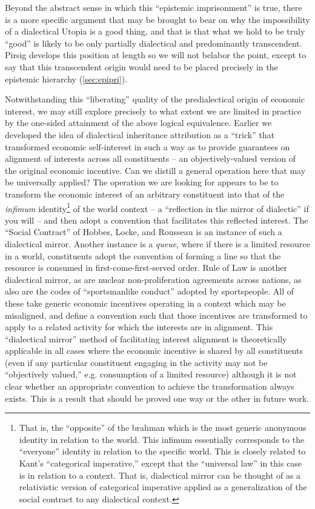 \documentclass[pra,twocolumn,groupedaddress,10pt]{revtex4}
\theoremstyle{definition}
\begin{document}
Beyond the abstract sense in which this ``epistemic imprisonment'' is true, there is a more specific argument that may be brought to bear on why the impossibility of a dialectical Utopia is a good thing, and that is that what we hold to be truly ``good'' is likely to be only partially dialectical and predominantly transcendent. Pirsig\cite{pirsig} develops this position at length so we will not belabor the point, except to say that this transcendent origin would need to be placed precisely in the epistemic hierarchy (\autoref{sec:epipri}).

Notwithstanding this ``liberating'' quality of the predialectical origin of economic interest, we may still explore precisely to what extent we are limited in practice by the one-sided attainment of the above logical equivalence. Earlier we developed the idea of dialectical inheritance attribution as a ``trick'' that transformed economic self-interest in such a way as to provide guarantees on alignment of interests across all constituents -- an objectively-valued version of the original economic incentive. Can we distill a general operation here that may be universally applied? The operation we are looking for appears to be to transform the economic interest of an arbitrary constituent into that of the \emph{infimum} identity\footnote{That is, the ``opposite'' of the brahman which is the most generic anonymous identity in relation to the world. This infimum essentially corresponds to the ``everyone'' identity in relation to the specific world. This is closely related to Kant's ``categorical imperative,''\cite{kant2} except that the ``universal law'' in this case is in relation to a context. That is, dialectical mirror can be thought of as a relativistic version of categorical imperative applied as a generalization of the social contract to any dialectical context.} of the world context -- a ``reflection in the mirror of dialectic'' if you will -- and then adopt a convention that facilitates this reflected interest. The ``Social Contract'' of Hobbes, Locke, and Rousseau is an instance of such a dialectical mirror. Another instance is a \emph{queue}, where if there is a limited resource in a world, constituents adopt the convention of forming a line so that the resource is consumed in first-come-first-served order. Rule of Law is another dialectical mirror, as are nuclear non-proliferation agreements across nations, as also are the codes of ``sportsmanlike conduct'' adopted by sportspeople. All of these take generic economic incentives operating in a context which may be misaligned, and define a convention such that those incentives are transformed to apply to a related activity for which the interests are in alignment. This ``dialectical mirror'' method of facilitating interest alignment is theoretically applicable in all cases where the economic incentive is shared by all constituents (even if any particular constituent engaging in the activity may not be ``objectively valued,'' e.g. consumption of a limited resource) although it is not clear whether an appropriate convention to achieve the transformation always exists. This is a result that should be proved one way or the other in future work.
\end{document}
